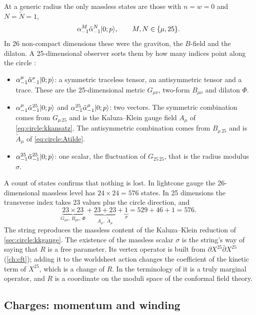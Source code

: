 At a generic radius the only massless states are those with $n=w=0$ and $N=\tilde N=1$,
\[
 \alpha^{M}_{-1}\tilde\alpha^{N}_{-1}|0;p\rangle,\qquad M,N\in\{\mu,25\}.
\]
In 26 non-compact dimensions these were the graviton, the $B$-field and the dilaton. A
25-dimensional observer sorts them by how many indices point along the circle
:
\begin{itemize}[leftmargin=*]
\item $\alpha^\mu_{-1}\tilde\alpha^\nu_{-1}|0;p\rangle$: a symmetric traceless tensor, an
antisymmetric tensor and a trace. These are the 25-dimensional metric $G_{\mu\nu}$, two-form
$B_{\mu\nu}$ and dilaton $\Phi$.
\item $\alpha^\mu_{-1}\tilde\alpha^{25}_{-1}|0;p\rangle$ and
$\alpha^{25}_{-1}\tilde\alpha^{\mu}_{-1}|0;p\rangle$: two vectors. The symmetric combination
comes from $G_{\mu\,25}$ and is the Kaluza--Klein gauge field $A_\mu$ of
\eqref{eq:circle:kkansatz}. The antisymmetric combination comes from $B_{\mu\,25}$ and is
$\tilde A_\mu$ of \eqref{eq:circle:Atilde}.
\item $\alpha^{25}_{-1}\tilde\alpha^{25}_{-1}|0;p\rangle$: one scalar, the fluctuation of
$G_{25\,25}$, that is the radius modulus $\sigma$.
\end{itemize}
A count of states confirms that nothing is lost. In lightcone gauge the 26-dimensional massless
level has $24\times24=576$ states. In 25 dimensions the transverse index takes $23$ values plus
the circle direction, and
\[
 \underbrace{23\times23}_{G_{\mu\nu},\,B_{\mu\nu},\,\Phi}
 +\underbrace{23+23}_{A_\mu,\;\tilde A_\mu}+\underbrace{1}_{\sigma}=529+46+1=576 .
\]
The string reproduces the massless content of the Kaluza--Klein reduction of
\cref{sec:circle:kkgauge}. The existence of the massless scalar $\sigma$ is the string's way
of saying that $R$ is a free parameter. Its vertex operator is built from
$\partial X^{25}\bar\partial X^{25}$ (\cref{ch:cft}); adding it to the worldsheet action changes
the coefficient of the kinetic term of $X^{25}$, which is a change of $R$. In the terminology
of  it is a truly marginal operator, and $R$ is a coordinate on
the moduli space of the conformal field theory.

\subsection{Charges: momentum and winding}

